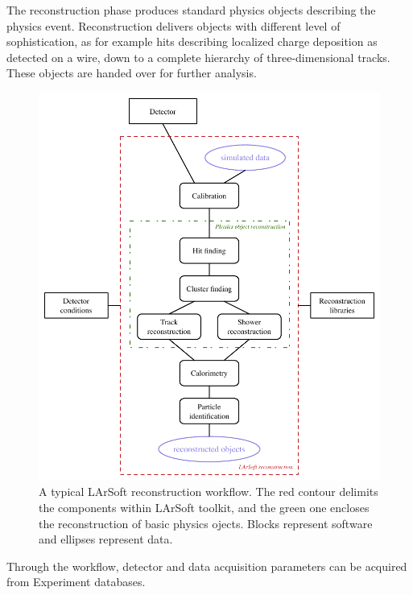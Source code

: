 The reconstruction phase produces standard physics objects describing the physics event.
Reconstruction delivers objects with different level of sophistication,
as for example hits describing localized charge deposition as detected on a wire,
down to a complete hierarchy of three-dimensional tracks.
These objects are handed over for further analysis.
\begin{figure}
   \centering
   \includegraphics{figures/LArSoftReconstructionWorkflow}
   \caption{\label{fig:LArSoftReconstruction}
      A typical LArSoft reconstruction workflow.
      The red contour delimits the components within LArSoft toolkit,
      and the green one encloses the reconstruction of basic physics ojects.
      Blocks represent software and ellipses represent data.
}
\end{figure}
Through the workflow, detector and data acquisition parameters
can be acquired from Experiment databases.

